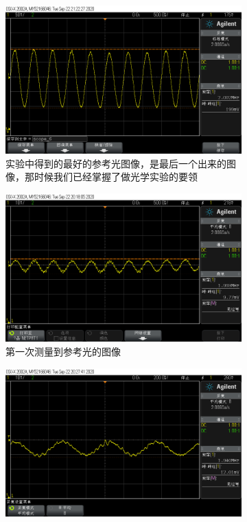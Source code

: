 \documentclass{ctexart}
\begin{document}
\begin{figure}[H]
  \centering
  \begin{subfigure}{.96\textwidth}
    \centering
    \includegraphics[width=\linewidth]{双频激光干涉装置图像/参考光4}
    \caption{实验中得到的最好的参考光图像，是最后一个出来的图像，那时候我们已经掌握了做光学实验的要领}
  \end{subfigure}
  \begin{subfigure}{.32\textwidth}
    \centering
    \includegraphics[width=\linewidth]{双频激光干涉装置图像/参考光1}
    \caption{第一次测量到参考光的图像}
  \end{subfigure}
  \begin{subfigure}{.32\textwidth}
    \centering
    \includegraphics[width=\linewidth]{双频激光干涉装置图像/参考光2}

\end{subfigure}
\end{figure}
\end{document}
